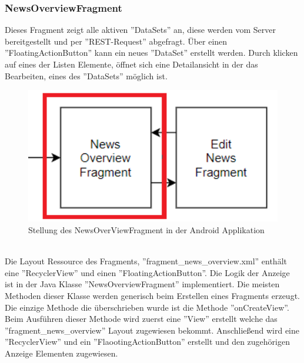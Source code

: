 \subsubsection{NewsOverviewFragment}
Dieses Fragment zeigt alle aktiven ''DataSets'' an, diese werden vom Server bereitgestellt und per ''REST-Request'' abgefragt. Über einen ''FloatingActionButton'' kann ein neues ''DataSet'' erstellt werden. Durch klicken auf eines der Listen Elemente, öffnet sich eine Detailansicht in der das Bearbeiten, eines des ''DataSets'' möglich ist.
\\
\begin{figure}[H]
\centering
\includegraphics[width=1.0\textwidth]{images/06_AndroidApp/06_NewsOverviewStellung}
\caption{Stellung des NewsOverViewFragment in der Android Applikation}
\label{fig:mediaNav}
\end{figure}
\\
Die Layout Ressource des Fragments, ''fragment\_news\_overview.xml'' enthält eine ''RecyclerView'' und einen ''FloatingActionButton''. Die Logik der Anzeige ist in der Java Klasse ''NewsOverviewFragment'' implementiert. Die meisten Methoden dieser Klasse werden generisch beim Erstellen eines Fragments erzeugt. Die einzige Methode die überschrieben wurde ist die Methode ''onCreateView''. Beim Ausführen dieser Methode wird zuerst eine ''View'' erstellt welche das ''fragment\_news\_overview'' Layout zugewiesen bekommt. Anschließend wird eine ''RecyclerView'' und ein ''FlaootingActionButton'' erstellt und den zugehörigen Anzeige Elementen zugewiesen.
